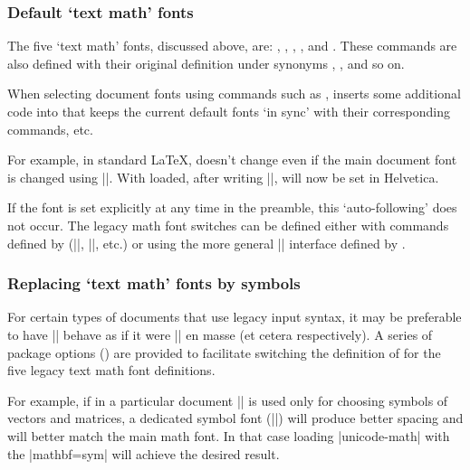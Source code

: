 \subsubsection{Default `text math' fonts}

The five `text math' fonts, discussed above, are: , , , , and .
These commands are also defined with their original definition under synonyms , , and so on.

When selecting document fonts using  commands such as ,  inserts some additional code into  that keeps the current default fonts `in sync' with their corresponding  commands, etc.

For example, in standard \LaTeX,  doesn't change even if the main document font is changed using |\renewcommand\sfdefault{...}|. With  loaded, after writing |\setsansfont{Helvetica}|,  will now be set in Helvetica.

If the  font is set explicitly at any time in the preamble, this `auto-following' does not occur. The legacy math font switches can be defined either with commands defined by  (|\setmathrm|, |\setmathsf|, etc.) or using the more general |\setmathfontface\mathsf| interface defined by .


\subsubsection{Replacing `text math' fonts by symbols}

For certain types of documents that use legacy input syntax, it may be preferable to have |\mathbf| behave as if it were |\symbf| en masse (et cetera respectively).
A series of package options () are provided to facilitate switching the definition of  for the five legacy text math font definitions.

For example, if in a particular document |\mathbf| is used only for choosing symbols of vectors and matrices, a dedicated symbol font (|\symbf|) will produce better spacing and will better match the main math font.
In that case loading |unicode-math| with the |mathbf=sym| will achieve the desired result.

